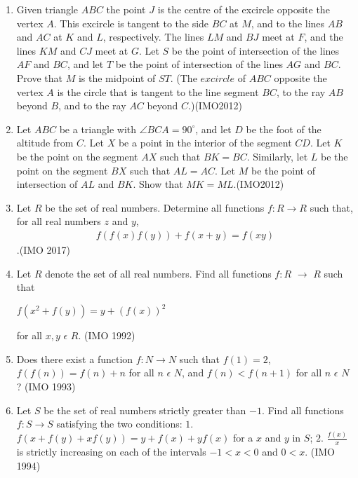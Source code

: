 \begin{enumerate}
			\item Given triangle $ABC$ the point $J$ is the centre of the excircle opposite the vertex $A$. This excircle is tangent to the side $BC$ at $M$, and to the lines $AB$ and $AC$ at $K$ and $L$, respectively. The lines $LM$ and $BJ$ meet at $F$, and the lines $KM$ and $CJ$ meet at $G$. Let $S$ be the point of intersection of the lines $AF$ and $BC$, and let $T$ be the point of intersection of the lines $AG$ and $BC$. Prove that $M$ is the midpoint of $ST$.
				(The $excircle$ of $ABC$ opposite the vertex $A$ is the circle that is tangent to the line segment $BC$, to the ray $AB$ beyond $B$, and to the ray $AC$ beyond $C$.)\hfill(IMO2012)
			\item  Let $ABC$ be a triangle with $\angle{BCA}=90^{\circ}$, and let $D$ be the foot of the altitude from $C$. Let $X$ be a point in the interior of the segment $CD$. Let $K$ be the point on the segment $AX$ such that $BK = BC$. Similarly, let $L$ be the point on the segment $BX$ such that $AL=AC$. Let $M$ be the point of intersection of $AL$ and $BK$.
				Show that $MK=ML$.\hfill(IMO2012)
				\item Let $R$ be the set of real numbers. Determine all functions $f:R\rightarrow R$ such that, for all real numbers $z$ and $y$, \begin{align}f(f(x)f(y))+f(x+y)=f(xy)\end{align}.\hfill (IMO 2017)
				\item Let ${R}$ denote the set of all real numbers. Find all functions $f : {R}$ $\rightarrow$ ${R}$ such that                                           

$f(x^{2}+f(y))=y+(f(x))^{2}$                          
                                       
for all $x, y$ $\epsilon$ $R$.  \hfill(IMO 1992)
\item Does there exist a function $f : N \rightarrow N$ such that $f(1) = 2$, $f(f(n)) = f(n) + n$ for all $n$ $\epsilon$ $N$, and $f(n) < f(n + 1)$ for all $n$ $\epsilon$ $N$ ? \hfill(IMO 1993)
\item Let $S$ be the set of real numbers strictly greater than $-1$. Find all functions $f : S \rightarrow S$  satisfying the two conditions:                                                                 
	$1$. $f(x + f(y) + xf(y)) = y + f(x) + yf(x)$ for a  $x$ and $y$ in $S$;                                                                                                           
$2$. $\frac{f(x)}{x}$ is strictly increasing on each of the intervals $-1<x<0$                                                    
		 and $0<x$.   \hfill(IMO 1994)
\end{enumerate}
